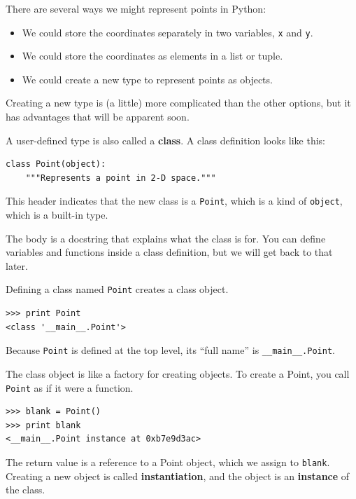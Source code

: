 \documentclass[10pt]{book}
\begin{document}
There are several ways we might represent points in Python:

\begin{itemize}

\item We could store the coordinates separately in two
variables, {\tt x} and {\tt y}.

\item We could store the coordinates as elements in a list
or tuple.

\item We could create a new type to represent points as
objects.

\end{itemize}

Creating a new type
is (a little) more complicated than the other options, but
it has advantages that will be apparent soon.

A user-defined type is also called a {\bf class}.
A class definition looks like this:

\begin{verbatim}
class Point(object):
    """Represents a point in 2-D space."""
\end{verbatim}
%
This header indicates that the new class is a {\tt Point},
which is a kind of {\tt object}, which is a built-in
type.

The body is a docstring that explains what the class is for.
You can define variables and functions inside a class definition,
but we will get back to that later.

Defining a class named {\tt Point} creates a class object.

\begin{verbatim}
>>> print Point
<class '__main__.Point'>
\end{verbatim}
%
Because {\tt Point} is defined at the top level, its ``full
name'' is \verb"__main__.Point".

The class object is like a factory for creating objects.  To create a
Point, you call {\tt Point} as if it were a function.

\begin{verbatim}
>>> blank = Point()
>>> print blank
<__main__.Point instance at 0xb7e9d3ac>
\end{verbatim}
%
The return value is a reference to a Point object, which we
assign to {\tt blank}.
Creating a new object is called
{\bf instantiation}, and the object is an {\bf instance} of
the class.
\end{document}
